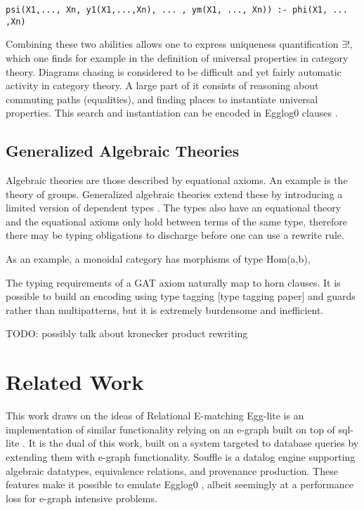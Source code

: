 \documentclass[sigplan,10pt,review,anonymous]{acmart}
\begin{document}
\begin{lstlisting}
psi(X1,..., Xn, y1(X1,...,Xn), ... , ym(X1, ..., Xn)) :- phi(X1, ... ,Xn)
\end{lstlisting}

Combining these two abilities allows one to express uniqueness quantification $\exists!$, which one finds for example in the definition of universal properties in category theory. Diagrams chasing is considered to be difficult and yet fairly automatic activity in category theory. A large part of it consists of reasoning about commuting paths (equalities), and finding places to instantiate universal properties\cite{catnapp}. This search and instantiation can be encoded in Egglog0 clauses \cite{pullback, pullback2}.

\subsection{Generalized Algebraic Theories}
Algebraic theories are those described by equational axioms. An example is the theory of groups. Generalized algebraic theories extend these by introducing a limited version of dependent types \cite{catlab, cartmell}. The types also have an equational theory and the equational axioms only hold between terms of the same type, therefore there may be typing obligations to discharge before one can use a rewrite rule.

As an example, a monoidal category has morphisms of type Hom(a,b),

The typing requirements of a GAT axiom naturally map to horn clauses. It is possible to build an encoding using type tagging [type tagging paper] and guards rather than multipatterns, but it is extremely burdensome and inefficient.

TODO: possibly talk about kronecker product rewriting

\section{Related Work}
This work draws on the ideas of Relational E-matching \cite{rel_ematch}
Egg-lite is an implementation of similar functionality relying on an e-graph built on top of sql-lite \cite{egg-lite}. It is the dual of this work, built on a system targeted to database queries by extending them with e-graph functionality.
Souffle\cite{souffle} is a datalog engine supporting algebraic datatypes, equivalence relations, and provenance production. These features make it possible to emulate Egglog0 \cite{naivesouffle, soufflepost2, soufflepost3}, albeit seemingly at a performance loss for e-graph intensive problems.
\end{document}
